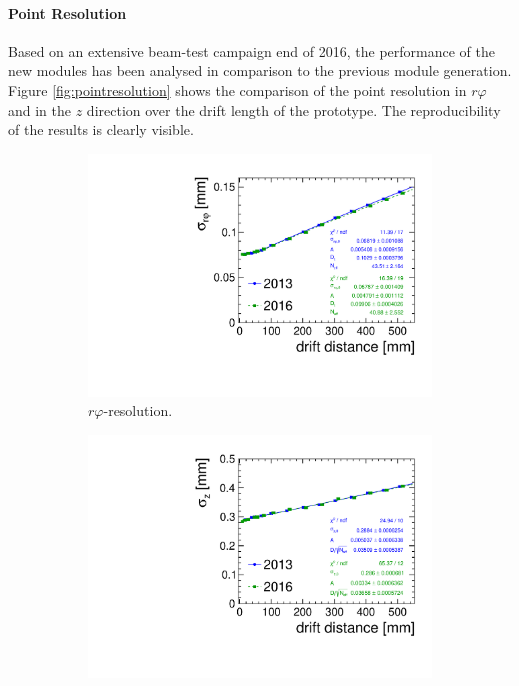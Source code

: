 \paragraph{Point Resolution}

Based on an extensive beam-test campaign end of 2016, the performance of the new modules has been analysed in comparison to the previous module generation.
Figure \ref{fig:pointresolution} shows the comparison of the point resolution in $r\varphi$ and in the $z$ direction over the drift length of the prototype. The reproducibility of the results is clearly visible.

\begin{figure}[tbhp!]
\begin{subfigure}[b]{0.48\textwidth}
\includegraphics[width=\textwidth]{Tracker/TPC_Bonn/plots/TPC-DG_rphiResolution_combi_fit_global.pdf}
\caption{$r\varphi$-resolution.}
\label{sfig:pres_13-16_rphi}
\end{subfigure}
\hfill
\begin{subfigure}[b]{0.48\textwidth}
\includegraphics[width=\textwidth]{Tracker/TPC_Bonn/plots/TPC-DG_zResolution_combi_fit.pdf}

\end{subfigure}
\end{figure}
